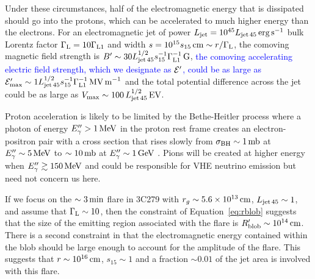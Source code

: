 \documentclass[twocolumn,linenumbers]{aastex62}
\newcommand{\response}[1]{\textcolor{blue}{#1}}
\begin{document}
Under these circumstances, half of the electromagnetic energy that is dissipated should go into the protons, which can be accelerated to much higher energy than the electrons. For an electromagnetic jet of power $L_{\rm jet}=10^{45}L_{\rm jet\,45}\,{\rm erg\,s}^{-1}$ bulk Lorentz factor $\Gamma_{\rm L}=10\Gamma_{\rm L1}$ and width $s=10^{15}s_{15}\,{\rm cm}\sim r/\Gamma_{\rm L}$, the comoving magnetic field strength is $B'\sim30L_{\rm jet\,45}^{1/2}s_{15}^{-1}\Gamma_{\rm L1}^{-1}\,{\rm G}$, 
\response{
the comoving accelerating electric field strength, which we designate as $\cal E'$, could be as large as ${\cal E}'_{\rm max}\sim1L_{\rm jet\,45}^{1/2}s_{15}^{-1}\Gamma_{\rm L1}^{-1}\,{\rm MV\,m}^{-1}$
}
and the total potential difference across the jet could be as large as $V_{\rm max}\sim100\,L_{\rm jet\,45}^{1/2}\,{\rm EV}$. 

Proton acceleration is likely to be limited by the Bethe-Heitler process where a photon of energy $E''_\gamma>1\,{\rm MeV}$ in the proton rest frame creates an electron-positron pair with a cross section that rises slowly from $\sigma_{\rm BH}\sim1\,{\rm mb}$ at $E_\gamma''\sim5\,{\rm MeV}$ to $\sim 10\,{\rm mb}$ at $E_\gamma''\sim1\,{\rm GeV}$ \citep[e.g.,][]{2009herb.book.....D}. Pions will be created at higher energy when $E''_{\gamma}\gtrsim150\,{\rm MeV}$ and could be responsible for VHE neutrino emission but need not concern us here. 

If we focus on the $\sim3\,{\rm min}$ flare in 3C279 with %
$r_g\sim5.6\times10^{13}\,{\rm cm}$, 
$L_{\rm jet\,45}\sim1$, and assume that $\Gamma_{\rm L}\sim10$, then the constraint of Equation~\ref{eq:rblob} suggests that the size of the emitting region associated with the flare is $R'_{\rm blob}\sim10^{14}\,{\rm cm}$. There is a second constraint in that the electromagnetic energy contained within the blob should be large enough to account for the amplitude of the flare. This suggests that $r\sim10^{16}\,{\rm cm}$, $s_{15}\sim1$ and a fraction $\sim0.01$ of the jet area is involved with this flare. 
\end{document}
